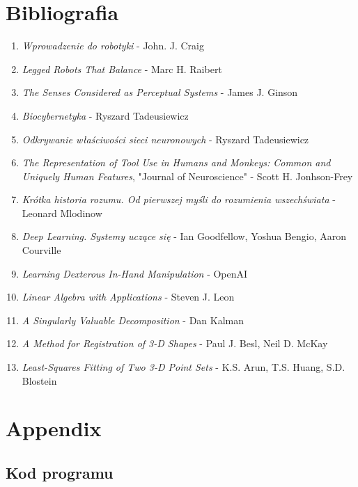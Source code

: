 \documentclass[12pt]{article}
\begin{document}
\section*{Bibliografia}
\begin{enumerate}
\item \emph{Wprowadzenie do robotyki} - John. J. Craig
\item \emph{Legged Robots That Balance} - Marc H. Raibert
\item \emph{The Senses Considered as Perceptual Systems} - James J. Ginson
\item \emph{Biocybernetyka} - Ryszard Tadeusiewicz
\item \emph{Odkrywanie właściwości sieci neuronowych} - Ryszard Tadeusiewicz
\item \emph{The Representation of Tool Use in Humans and Monkeys: Common and Uniquely Human Features}, "Journal of Neuroscience" - Scott H. Jonhson-Frey
\item \emph{Krótka historia rozumu. Od pierwszej myśli do rozumienia wszechświata} - Leonard Mlodinow
\item \emph{Deep Learning. Systemy uczące się} - Ian Goodfellow, Yoshua Bengio, Aaron Courville
\item \emph{Learning Dexterous In-Hand Manipulation} - OpenAI
\item \emph{Linear Algebra with Applications} - Steven J. Leon
\item \emph{A Singularly Valuable Decomposition} - Dan Kalman
\item \emph{A Method for Registration of 3-D Shapes} - Paul J. Besl, Neil D. McKay
\item \emph{Least-Squares Fitting of Two 3-D Point Sets} - K.S. Arun, T.S. Huang, S.D. Blostein
\end{enumerate}

\section*{Appendix}
\subsection*{Kod programu}

\end{document}
